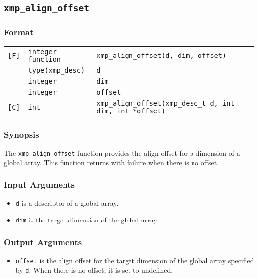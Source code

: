 \subsection{\tt xmp\_align\_offset}

\subsubsection*{Format}

\begin{tabular}{lll}

\verb![F]!& {\tt integer function}& {\tt xmp\_align\_offset(d, dim, offset)}\\
          & {\tt type(xmp\_desc)} & {\tt d}\\
          & {\tt integer} & {\tt dim}\\
          & {\tt integer} & {\tt offset}\\

\verb![C]!&  {\tt int}& {\tt xmp\_align\_offset(xmp\_desc\_t d, int dim, int *offset)}\\

\end{tabular}

\subsubsection*{Synopsis}

The {\tt xmp\_align\_offset} function provides the align offset for a
dimension of a global array. This function returns with failure when
there is no offset.

\subsubsection*{Input Arguments}
\begin{itemize}
 \item {\tt d} is a descriptor of a global array.
 \item {\tt dim} is the target dimension of the global array.
\end{itemize}

\subsubsection*{Output Arguments}
\begin{itemize}
 \item {\tt offset} is the align offset for the target dimension of the
       global array specified by {\tt d}. When there is no offset, it is
       set to undefined.
\end{itemize}


